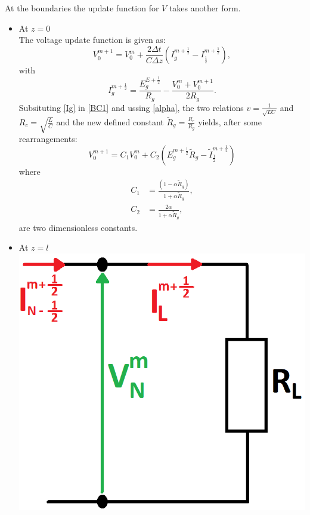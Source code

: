 \documentclass[dutch, a4paper, 11pt]{article}
\begin{document}
\begin{multicols}{2}
At the boundaries the update function for $V$ takes another form.
\begin{itemize}
    \item At $z = 0$\\
    The voltage update function is given as:
    \begin{equation}
        V^{m+1}_{0} = V^{m}_{0} + \frac{2\Delta t}{C\Delta z}\left(I^{m+\frac{1}{2}}_{g} - I^{m+\frac{1}{2}}_{\frac{1}{2}}\right),
        \label{BC1}
    \end{equation}
    with 
    \begin{equation}
        I^{m+\frac{1}{2}}_{g} = \frac{E^{E+\frac{1}{2}}_{g}}{R_{g}}-\frac{V^{m}_{0}+V^{m+1}_{0}}{2R_g}.
        \label{Ig}
    \end{equation}
    Subsituting \ref{Ig} in \ref{BC1} and ussing \ref{alpha}, the two relations $v=\frac{1}{\sqrt{LC}}$ and $R_c=\sqrt{\frac{L}{C}}$ and the new defined constant $\tilde{R}_{g} = \frac{R_c}{R_g}$ yields, 
    after some rearrangements:
    \begin{equation}
        V^{m+1}_{0} = C_{1}V^{m}_{0} + C_{2}\left(E^{m+\frac{1}{2}}_{g}\tilde{R}_{g} - \tilde{I}^{m+\frac{1}{2}}_{\frac{1}{2}}\right)
    \end{equation}
    where
    \begin{align}
        C_{1} & = \frac{(1-\alpha\tilde{R}_{g})}{1+\alpha\tilde{R}_{g}},\\
        C_{2} & = \frac{2\alpha}{1+\alpha\tilde{R}_{g}},
    \end{align}
    are two dimensionless constants.
    \item At $z = l$\\
    \includegraphics[scale=0.25]{BC2}


\end{itemize}
\end{multicols}
\end{document}
